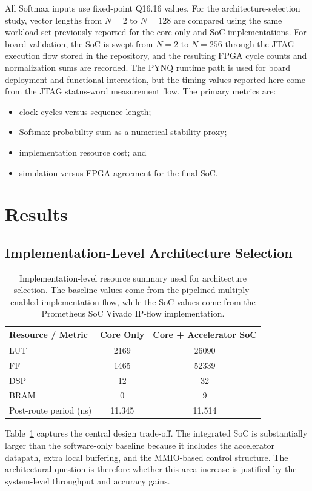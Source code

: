 \documentclass[conference]{IEEEtran}
\begin{document}
All Softmax inputs use fixed-point Q16.16 values. For the architecture-selection study, vector lengths from $N=2$ to $N=128$ are compared using the same workload set previously reported for the core-only and SoC implementations. For board validation, the SoC is swept from $N=2$ to $N=256$ through the JTAG execution flow stored in the repository, and the resulting FPGA cycle counts and normalization sums are recorded. The PYNQ runtime path is used for board deployment and functional interaction, but the timing values reported here come from the JTAG status-word measurement flow. The primary metrics are:
\begin{itemize}
\item clock cycles versus sequence length;
\item Softmax probability sum as a numerical-stability proxy;
\item implementation resource cost; and
\item simulation-versus-FPGA agreement for the final SoC.
\end{itemize}

\section{Results}
\subsection{Implementation-Level Architecture Selection}
\begin{table}[t]
\centering
\caption{Implementation-level resource summary used for architecture selection. The baseline values come from the pipelined multiply-enabled implementation flow, while the SoC values come from the Prometheus SoC Vivado IP-flow implementation.}
\label{tab:impl_compare}
\begin{tabular}{lcc}
\toprule
Resource / Metric & Core Only & Core + Accelerator SoC \\
\midrule
LUT & 2169 & 26090 \\
FF & 1465 & 52339 \\
DSP & 12 & 32 \\
BRAM & 0 & 9 \\
Post-route period (ns) & 11.345 & 11.514 \\
\bottomrule
\end{tabular}
\end{table}

Table~\ref{tab:impl_compare} captures the central design trade-off. The integrated SoC is substantially larger than the software-only baseline because it includes the accelerator datapath, extra local buffering, and the MMIO-based control structure. The architectural question is therefore whether this area increase is justified by the system-level throughput and accuracy gains.
\end{document}
